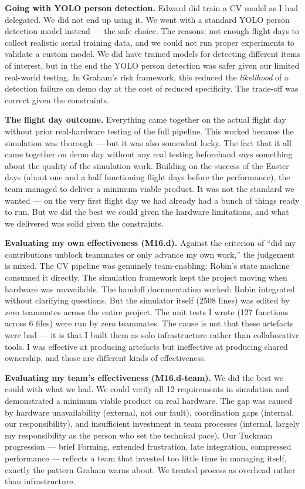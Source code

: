 \textbf{Going with YOLO person detection.} Edward did train a CV model as I had delegated. We did not end up using it. We went with a standard YOLO person detection model instead --- the safe choice. The reasons: not enough flight days to collect realistic aerial training data, and we could not run proper experiments to validate a custom model. We did have trained models for detecting different items of interest, but in the end the YOLO person detection was safer given our limited real-world testing. In Graham's risk framework, this reduced the \textit{likelihood} of a detection failure on demo day at the cost of reduced specificity. The trade-off was correct given the constraints.

\textbf{The flight day outcome.} Everything came together on the actual flight day without prior real-hardware testing of the full pipeline. This worked because the simulation was thorough --- but it was also somewhat lucky. The fact that it all came together on demo day without any real testing beforehand says something about the quality of the simulation work. Building on the success of the Easter days (about one and a half functioning flight days before the performance), the team managed to deliver a minimum viable product. It was not the standard we wanted --- on the very first flight day we had already had a bunch of things ready to run. But we did the best we could given the hardware limitations, and what we delivered was solid given the constraints.

\textbf{Evaluating my own effectiveness (M16.d).} Against the criterion of ``did my contributions unblock teammates or only advance my own work,'' the judgement is mixed. The CV pipeline was genuinely team-enabling: Robin's state machine consumed it directly. The simulation framework kept the project moving when hardware was unavailable. The handoff documentation worked: Robin integrated without clarifying questions. But the simulator itself (2508 lines) was edited by zero teammates across the entire project. The unit tests I wrote (127 functions across 6 files) were run by zero teammates. The cause is not that these artefacts were bad --- it is that I built them as solo infrastructure rather than collaborative tools. I was effective at producing artefacts but ineffective at producing shared ownership, and those are different kinds of effectiveness.

\textbf{Evaluating my team's effectiveness (M16.d-team).} We did the best we could with what we had. We could verify all 12 requirements in simulation and demonstrated a minimum viable product on real hardware. The gap was caused by hardware unavailability (external, not our fault), coordination gaps (internal, our responsibility), and insufficient investment in team processes (internal, largely my responsibility as the person who set the technical pace). Our Tuckman progression --- brief Forming, extended frustration, late integration, compressed performance --- reflects a team that invested too little time in managing itself, exactly the pattern Graham warns about. We treated process as overhead rather than infrastructure.

